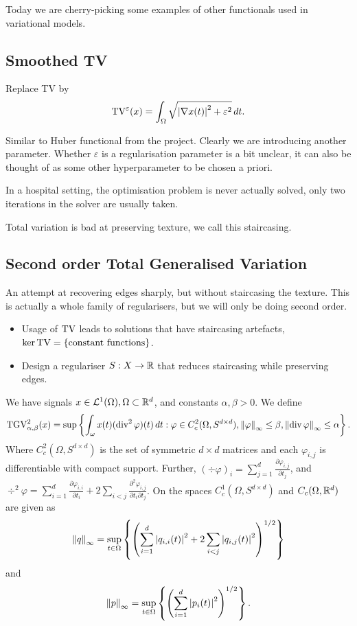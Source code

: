 \documentclass[12pt]{article}
\begin{document}
Today we are cherry-picking some examples of other functionals used in variational models.

\subsection{Smoothed TV}
Replace TV by $$\operatorname{TV}^\varepsilon(x) = \int_{\Omega} \sqrt{\left|\nabla x(t)\right|^2 + \varepsilon^2}\,dt.$$

Similar to Huber functional from the project. Clearly we are introducing another parameter. Whether $\varepsilon$ is a regularisation parameter is a bit unclear, it can also be thought of as some other hyperparameter to be chosen a priori.

In a hospital setting, the optimisation problem is never actually solved, only two iterations in the solver are usually taken.

Total variation is bad at preserving texture, we call this staircasing.

\subsection{Second order Total Generalised Variation}
An attempt at recovering edges sharply, but without staircasing the texture. This is actually a whole family of regularisers, but we will only be doing second order.

\begin{itemize}
    \item Usage of $\operatorname{TV}$ leads to solutions that have staircasing artefacts, $\ker\operatorname{TV} = \left\{\text{constant functions}\right\}$.
    \item Design a regulariser $S:X\to\mathbb{R}$ that reduces staircasing while preserving edges. 
\end{itemize}
\begin{definition}
    We have signals $x\in\mathcal{L}^1(\Omega), \Omega\subset \mathbb{R}^d$, and constants $\alpha,\beta>0$. We define
    \begin{equation*}
        \operatorname{TGV^2_{\alpha,\beta}}(x) = \sup \left\{\int_\omega x(t)(\operatorname{div}^2\varphi)(t)\,dt: \varphi\in C_c^2(\Omega,S^{d\times d}), \left\lVert\varphi\right\rVert_\infty \leq \beta, \left\lVert\operatorname{div} \varphi\right\rVert_\infty \leq \alpha\right\}.
    \end{equation*}
    Where $C_c^2(\Omega,S^{d\times d})$ is the set of symmetric $d\times d$ matrices and each $\varphi_{i,j}$ is differentiable with compact support. Further, $(\div \varphi)_i = \sum_{j=1}^d\frac{\partial \varphi_{i,j}}{\partial t_j}$, and $\div^2 \varphi = \sum_{i=1}^d\frac{\partial \varphi_{i,i}}{\partial t_i} + 2\sum_{i<j} \frac{\partial^2\varphi_{i,j}}{\partial t_i\partial t_j}$. On the spaces $C^1_c(\Omega,S^{d\times d})$ and
     $C_c(\Omega,\mathbb{R}^d)$ are given as $$\left\lVert q\right\rVert_\infty = \sup_{t\in\Omega}\left\{\left(\sum_{i=1}^d \left|q_{i,i}(t)\right|^2 + 2\sum_{i<j}\left|q_{i,j}(t)\right|^2\right)^{1/2}\right\}$$ 
     and $$\left\lVert p\right\rVert_\infty = \sup_{t\in\Omega} \left\{\left(\sum_{i=1}^d \left|p_i(t)\right|^2\right)^{1/2}\right\}.$$
\end{definition}
\end{document}
